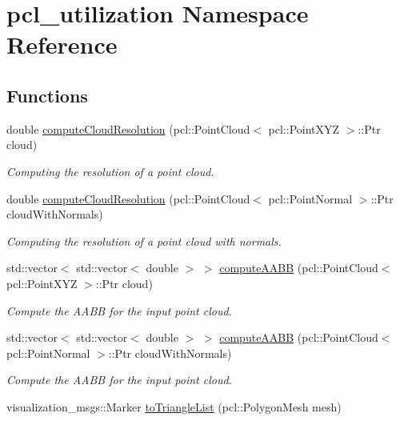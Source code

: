 \hypertarget{namespacepcl__utilization}{}\section{pcl\+\_\+utilization Namespace Reference}
\label{namespacepcl__utilization}
\subsection*{Functions}
\begin{DoxyCompactItemize}
\item 
double \hyperlink{namespacepcl__utilization_ac199fc2120c5dce78fd87c2c1e0445d0}{compute\+Cloud\+Resolution} (pcl\+::\+Point\+Cloud$<$ pcl\+::\+Point\+X\+YZ $>$\+::Ptr cloud)
\begin{DoxyCompactList}\small\item\em Computing the resolution of a point cloud. \end{DoxyCompactList}\item 
double \hyperlink{namespacepcl__utilization_a406bb7467e9ca4e3835c7c34076427e8}{compute\+Cloud\+Resolution} (pcl\+::\+Point\+Cloud$<$ pcl\+::\+Point\+Normal $>$\+::Ptr cloud\+With\+Normals)
\begin{DoxyCompactList}\small\item\em Computing the resolution of a point cloud with normals. \end{DoxyCompactList}\item 
std\+::vector$<$ std\+::vector$<$ double $>$ $>$ \hyperlink{namespacepcl__utilization_a21484054fe6624a5c1b6fad0c033ad95}{compute\+A\+A\+BB} (pcl\+::\+Point\+Cloud$<$ pcl\+::\+Point\+X\+YZ $>$\+::Ptr cloud)
\begin{DoxyCompactList}\small\item\em Compute the A\+A\+BB for the input point cloud. \end{DoxyCompactList}\item 
std\+::vector$<$ std\+::vector$<$ double $>$ $>$ \hyperlink{namespacepcl__utilization_af40198164242e7837f20357bd802b8c9}{compute\+A\+A\+BB} (pcl\+::\+Point\+Cloud$<$ pcl\+::\+Point\+Normal $>$\+::Ptr cloud\+With\+Normals)
\begin{DoxyCompactList}\small\item\em Compute the A\+A\+BB for the input point cloud. \end{DoxyCompactList}\item 
visualization\+\_\+msgs\+::\+Marker \hyperlink{namespacepcl__utilization_a051f0954371074c7331ba054d185950f}{to\+Triangle\+List} (pcl\+::\+Polygon\+Mesh mesh)

\end{DoxyCompactItemize}

